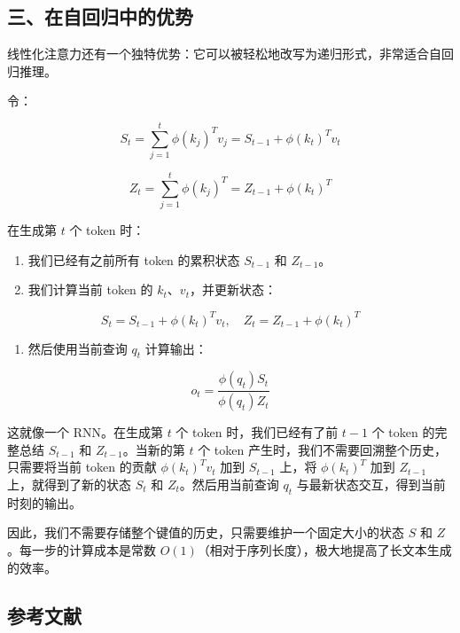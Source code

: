 \hypertarget{ux4e09ux5728ux81eaux56deux5f52ux4e2dux7684ux4f18ux52bf}{%
\subsection{三、在自回归中的优势}\label{ux4e09ux5728ux81eaux56deux5f52ux4e2dux7684ux4f18ux52bf}}

线性化注意力还有一个独特优势：它可以被轻松地改写为递归形式，非常适合自回归推理。

令：

\[
S_t = \sum_{j=1}^{t}\phi(k_j)^T v_j
= S_{t-1}+\phi(k_t)^T v_t
\]

\[
Z_t = \sum_{j=1}^{t}\phi(k_j)^T
= Z_{t-1}+\phi(k_t)^T
\]

在生成第 \(t\) 个 token 时：

\begin{enumerate}
\def\labelenumi{\arabic{enumi}.}
\tightlist
\item
  我们已经有之前所有 token 的累积状态 \(S_{t-1}\) 和 \(Z_{t-1}\)。
\item
  我们计算当前 token 的 \(k_t\)、\(v_t\)，并更新状态：
\end{enumerate}

\[
S_t = S_{t-1}+\phi(k_t)^T v_t,\quad
Z_t = Z_{t-1}+\phi(k_t)^T
\]

\begin{enumerate}
\def\labelenumi{\arabic{enumi}.}
\setcounter{enumi}{2}
\tightlist
\item
  然后使用当前查询 \(q_t\) 计算输出：
\end{enumerate}

\[
o_t = \frac{\phi(q_t)S_t}{\phi(q_t)Z_t}
\]

这就像一个 RNN。在生成第 \(t\) 个 token 时，我们已经有了前 \(t-1\) 个 token 的完整总结 \(S_{t-1}\) 和 \(Z_{t-1}\)。当新的第 \(t\) 个 token 产生时，我们不需要回溯整个历史，只需要将当前 token 的贡献 \(\phi(k_t)^T v_t\) 加到 \(S_{t-1}\) 上，将 \(\phi(k_t)^T\) 加到 \(Z_{t-1}\) 上，就得到了新的状态 \(S_t\) 和 \(Z_t\)。然后用当前查询 \(q_t\) 与最新状态交互，得到当前时刻的输出。

因此，我们不需要存储整个键值的历史，只需要维护一个固定大小的状态 \(S\) 和 \(Z\)。每一步的计算成本是常数 \(O(1)\)（相对于序列长度），极大地提高了长文本生成的效率。

\hypertarget{ux53c2ux8003ux6587ux732e-97}{%
\subsection{参考文献}\label{ux53c2ux8003ux6587ux732e-97}}

